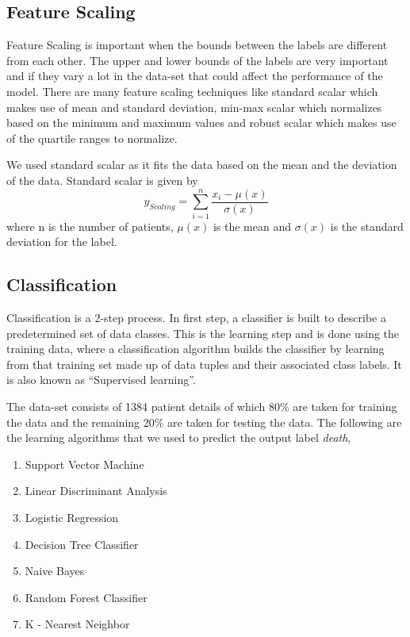 \documentclass[conference]{IEEEtran}
\begin{document}
\subsection{Feature Scaling}
\label{ssec:featurescale}
Feature Scaling is important when the bounds between the labels are different from each other. The upper and lower bounds of the labels are very important and if they vary a lot in the data-set that could affect the performance of the model. There are many feature scaling techniques like standard scalar which makes use of mean and standard deviation, min-max scalar which normalizes based on the minimum and maximum values and robust scalar which makes use of the quartile ranges to normalize.
\par 
We used standard scalar as it fits the data based on the mean and the deviation of the data. Standard scalar is given by 
\begin{equation}
 y_{Scaling} = \sum\limits_{i=1}^{n}\frac{x_i - \mu(x) }{\sigma(x)}
\end{equation}
where n is the number of patients, $\mu(x)$ is the mean and 
$\sigma(x)$ is the standard deviation for the label.
\subsection{Classification}
\label{ssec:classification}
Classification is a 2-step process. In first step, a classifier is built to describe a predetermined set of data classes. This is the learning step and is done using the training data, where a classification algorithm builds the classifier by learning from that training set made up of data tuples and their associated class labels. It is also known as “Supervised learning”. 
\par
The data-set consists of 1384 patient details of which 80\% are taken for training the data and the remaining 20\% are taken for testing the data. The following are the learning algorithms that we used to predict the output label \textit{death},
\begin{enumerate}
\item Support Vector Machine
\item Linear Discriminant Analysis
\item Logistic Regression
\item Decision Tree Classifier
\item Naive Bayes
\item Random Forest Classifier
\item K - Nearest Neighbor
\end{enumerate}
\par
\end{document}
